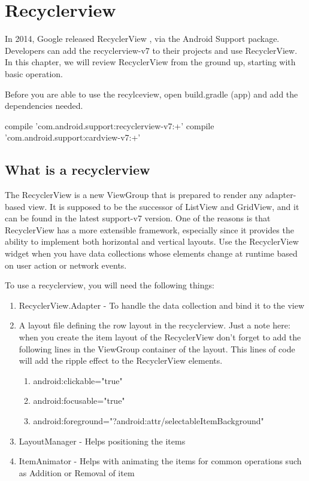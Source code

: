 \chapter{Recyclerview}
In 2014, Google released RecyclerView , via the Android Support package.
Developers can add the recyclerview-v7 to their projects and use RecyclerView. In this chapter, we will review RecyclerView from the ground up, starting with basic
operation.

Before you are able to use the recylceview,  open build.gradle (app) and add the dependencies needed.

\begin{xml}
    compile 'com.android.support:recyclerview-v7:+'
	compile 'com.android.support:cardview-v7:+'
\end{xml}

\section{What is a recyclerview}
The RecyclerView is a new ViewGroup that is prepared to render any adapter-based view. It is supposed to be the successor of ListView and GridView, and it can be found in the latest support-v7 version. One of the reasons is that RecyclerView has a more extensible framework, especially since it provides the ability to implement both horizontal and vertical layouts. Use the RecyclerView widget when you have data collections whose elements change at runtime based on user action or network events.

To use a recyclerview, you will need the following things:
\begin{enumerate}
	\item RecyclerView.Adapter - To handle the data collection and bind it to the view
	\item A layout file defining the row layout in the recyclerview. Just a note here: when you create the item layout of the RecyclerView don’t forget to add the following lines in the ViewGroup container of the layout. This lines of code will add the ripple effect to the RecyclerView elements.
	\begin{enumerate}
		\item  android:clickable="true"
		\item android:focusable="true"
		\item android:foreground="?android:attr/selectableItemBackground"
	\end{enumerate}
	\item LayoutManager - Helps positioning the items
	\item ItemAnimator - Helps with animating the items for common operations such as Addition or Removal of item
\end{enumerate}


